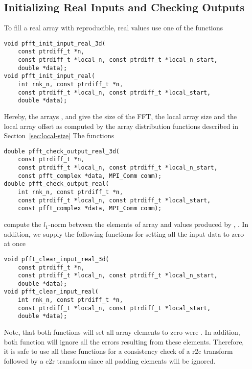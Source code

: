 \subsection{Initializing Real Inputs and Checking Outputs}\label{sec:init-data-3d-r2r}
To fill a real array  with reproducible, real values use one of the functions
\begin{lstlisting}
void pfft_init_input_real_3d(
    const ptrdiff_t *n,
    const ptrdiff_t *local_n, const ptrdiff_t *local_n_start,
    double *data);
void pfft_init_input_real(
    int rnk_n, const ptrdiff_t *n,
    const ptrdiff_t *local_n, const ptrdiff_t *local_start,
    double *data);
\end{lstlisting}
Hereby, the arrays ,  and  give the size of the FFT, the local array size and the local array offset
as computed by the array distribution functions described in Section~\ref{sec:local-size}
The functions
\begin{lstlisting}
double pfft_check_output_real_3d(
    const ptrdiff_t *n,
    const ptrdiff_t *local_n, const ptrdiff_t *local_n_start,
    const pfft_complex *data, MPI_Comm comm);
double pfft_check_output_real(
    int rnk_n, const ptrdiff_t *n,
    const ptrdiff_t *local_n, const ptrdiff_t *local_start,
    const pfft_complex *data, MPI_Comm comm);
\end{lstlisting}
compute the $l_1$-norm between the elements of array  and values produced by , .
In addition, we supply the following functions for setting all the input data to zero at once
\begin{lstlisting}
void pfft_clear_input_real_3d(
    const ptrdiff_t *n,
    const ptrdiff_t *local_n, const ptrdiff_t *local_n_start,
    double *data);
void pfft_clear_input_real(
    int rnk_n, const ptrdiff_t *n,
    const ptrdiff_t *local_n, const ptrdiff_t *local_start,
    double *data);
\end{lstlisting}

Note, that both  functions will set all array elements to zero were .
In addition, both  function will ignore all the errors resulting from these elements.
Therefore, it is safe to use all these functions for a consistency check of a r2c transform followed by a c2r transform since all padding elements will be ignored.


